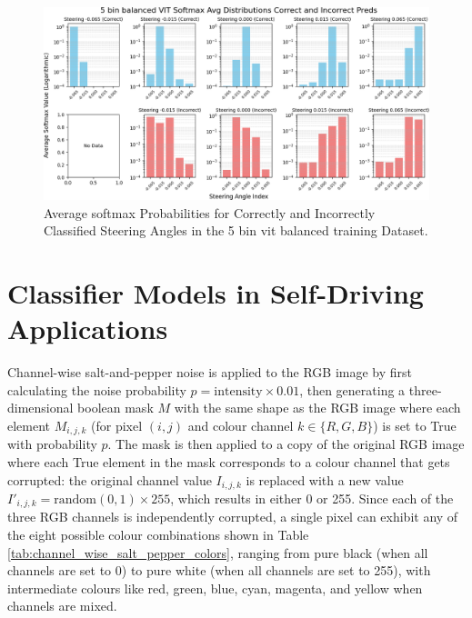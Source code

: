 \begin{figure}[H]
    \centering
    \includegraphics[width=1\linewidth]{Figures/Results/5_bins_vit_softmax_dist_plot_balanced.png}
    \caption{Average softmax Probabilities for Correctly and Incorrectly Classified Steering Angles in the 5 bin vit balanced training Dataset.}
    \label{fig:5_bins_vit_softmax_dist_balanced}
\end{figure}


\section{Classifier Models in Self-Driving Applications}

Channel-wise salt-and-pepper noise is applied to the RGB image by first calculating the noise probability $p = \text{intensity} \times 0.01$, then generating a three-dimensional boolean mask $M$ with the same shape as the RGB image where each element $M_{i,j,k}$ (for pixel $(i,j)$ and colour channel $k \in \{R,G,B\}$) is set to True with probability $p$. The mask is then applied to a copy of the original RGB image where each True element in the mask corresponds to a colour channel that gets corrupted: the original channel value $I_{i,j,k}$ is replaced with a new value $I'_{i,j,k} = \text{random}(0,1) \times 255$, which results in either 0 or 255. Since each of the three RGB channels is independently corrupted, a single pixel can exhibit any of the eight possible colour combinations shown in Table \ref{tab:channel_wise_salt_pepper_colors}, ranging from pure black (when all channels are set to 0) to pure white (when all channels are set to 255), with intermediate colours like red, green, blue, cyan, magenta, and yellow when channels are mixed.

